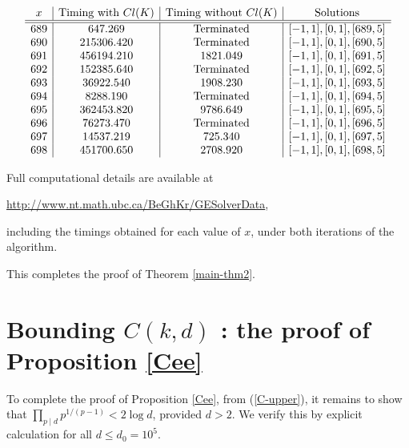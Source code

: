 {\[\begin{array}{c | c| c|c}
x & \text{Timing with } Cl(K) & \text{Timing without } Cl(K) & \text{Solutions} \\ \hline \hline
689 & 647.269 	& \text{Terminated} & [ -1, 1 ],[ 0, 1 ],[ 689, 5 ]  \\
690  & 215306.420 & \text{Terminated} & [ -1, 1 ],[ 0, 1 ],[ 690, 5 ] \\
691  & 456194.210 &   1821.049 & [ -1, 1 ],[ 0, 1 ],[ 691, 5 ] \\
692  & 152385.640 & \text{Terminated} & [ -1, 1 ],[ 0, 1 ],[ 692, 5 ] \\
693  & 36922.540  &    1908.230  & [ -1, 1 ],[ 0, 1 ],[ 693, 5 ]  \\
694  & 8288.190     & \text{Terminated}    &   [ -1, 1 ],[ 0, 1 ],[ 694, 5 ]   \\
695  & 362453.820  &   9786.649  &  [ -1, 1 ],[ 0, 1 ],[ 695, 5 ]  \\
696  & 76273.470 & \text{Terminated}  &    [ -1, 1 ],[ 0, 1 ],[ 696, 5 ] \\
697  & 14537.219  &    725.340  & [ -1, 1 ],[ 0, 1 ],[ 697, 5 ]  \\
698  & 451700.650 &    2708.920 &    [ -1, 1 ],[ 0, 1 ],[ 698, 5 ] \\
\end{array}\]
 
Full computational details are available at
\begin{center}
\url{http://www.nt.math.ubc.ca/BeGhKr/GESolverData},
\end{center}
including the timings obtained for each value of $x$, under both iterations of the algorithm. 

This completes the proof of Theorem \ref{main-thm2}.


\section{Bounding $C(k,d)$ : the proof of Proposition \ref{Cee}} \label{Cee-proof}


To complete the proof of Proposition \ref{Cee}, from (\ref{C-upper}), it remains to show that $\prod_{p \mid d} p^{1/(p-1)}  < 2 \log d$, provided $d > 2$. 
We verify this by explicit calculation for all $d \leq d_0 = 10^5$. 

}

